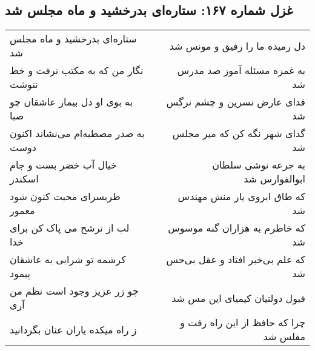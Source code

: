 \begin{center}
\section*{غزل شماره ۱۶۷: ستاره‌ای بدرخشید و ماه مجلس شد}
\label{sec:sh167}
\begin{longtable}{l p{0.5cm} r}
ستاره‌ای بدرخشید و ماه مجلس شد
&&
دل رمیده ما را رفیق و مونس شد
\\
نگار من که به مکتب نرفت و خط ننوشت
&&
به غمزه مسئله آموز صد مدرس شد
\\
به بوی او دل بیمار عاشقان چو صبا
&&
فدای عارض نسرین و چشم نرگس شد
\\
به صدر مصطبه‌ام می‌نشاند اکنون دوست
&&
گدای شهر نگه کن که میر مجلس شد
\\
خیال آب خضر بست و جام اسکندر
&&
به جرعه نوشی سلطان ابوالفوارس شد
\\
طربسرای محبت کنون شود معمور
&&
که طاق ابروی یار منش مهندس شد
\\
لب از ترشح می پاک کن برای خدا
&&
که خاطرم به هزاران گنه موسوس شد
\\
کرشمه تو شرابی به عاشقان پیمود
&&
که علم بی‌خبر افتاد و عقل بی‌حس شد
\\
چو زر عزیز وجود است نظم من آری
&&
قبول دولتیان کیمیای این مس شد
\\
ز راه میکده یاران عنان بگردانید
&&
چرا که حافظ از این راه رفت و مفلس شد
\\
\end{longtable}
\end{center}
